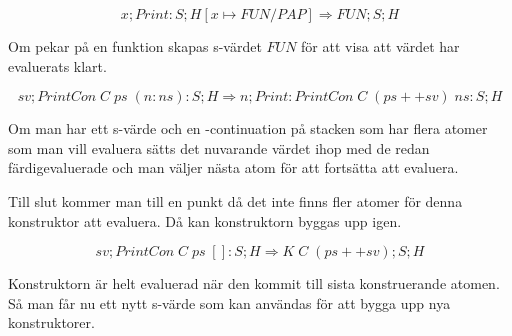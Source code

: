 \documentclass[../Appendix]{subfiles}
\begin{document}
\[
x ; Print : S ; H[x \mapsto FUN / PAP] \Rightarrow FUN ; S ; H
\]

Om  pekar på en funktion skapas s-värdet $FUN$ för att visa att värdet har
evaluerats klart. 


\[
sv ; PrintCon \; C \; ps \; (n : ns) : S ; H \Rightarrow n ; Print : PrintCon \; C \; 
(ps ++ sv) \; ns : S ; H
\]

Om man har ett s-värde och en -continuation på stacken som har flera
atomer som man vill evaluera sätts det nuvarande värdet ihop med de redan färdigevaluerade
och man väljer nästa atom för att fortsätta att evaluera.

Till slut kommer man till en punkt då det inte finns fler atomer för denna konstruktor
att evaluera. Då kan konstruktorn byggas upp igen.

\[
sv ; PrintCon \; C \; ps \; [] : S ; H
\Rightarrow K \; C \; (ps ++ sv) ; S ; H
\]

Konstruktorn är helt evaluerad när den kommit till sista konstruerande atomen. Så
man får nu ett nytt s-värde som kan användas för att bygga upp nya konstruktorer.
\end{document}
